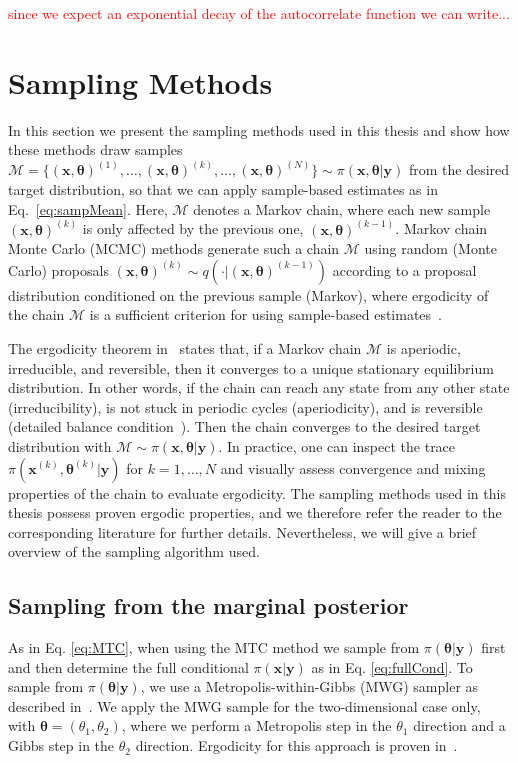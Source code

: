 \textcolor{red}{since we expect an exponential decay of the autocorrelate function we can write...}

\section{Sampling Methods}
\label{sec:sampling}
In this section we present the sampling methods used in this thesis and show how these methods draw samples $ \mathcal{M} = \{ (\bm{x}, \bm{\theta} )^{(1)}, \dots, (\bm{x}, \bm{\theta} )^{(k)}, \dots, (\bm{x}, \bm{\theta})^{(N)} \} \sim \pi(\bm{x}, \bm{\theta} |  \bm{y})$ from the desired target distribution, so that we can apply sample-based estimates as in Eq.~\ref{eq:sampMean}.
Here, $\mathcal{M}$ denotes a Markov chain, where each new sample $(\bm{x}, \bm{\theta})^{(k)}$ is only affected by the previous one, $(\bm{x}, \bm{\theta})^{(k-1)}$.
Markov chain Monte Carlo (MCMC) methods generate such a chain $\mathcal{M}$ using random (Monte Carlo) proposals $(\bm{x}, \bm{\theta})^{(k)} \sim q( \cdot |  (\bm{x}, \bm{\theta})^{(k-1)})$ according to a proposal distribution conditioned on the previous sample (Markov), where ergodicity of the chain $\mathcal{M}$ is a sufficient criterion for using sample-based estimates~\cite{tan2016LecNot, roberts2004general}.

The ergodicity theorem in~\cite{tan2016LecNot} states that, if a Markov chain $\mathcal{M}$ is aperiodic, irreducible, and reversible, then it converges to a unique stationary equilibrium distribution.
In other words, if the chain can reach any state from any other state (irreducibility), is not stuck in periodic cycles (aperiodicity), and is reversible (detailed balance condition~\cite{tan2016LecNot}).
Then the chain converges to the desired target distribution  with $ \mathcal{M} \sim \pi(\bm{x}, \bm{\theta} |  \bm{y})$.
In practice, one can inspect the trace $\pi(\bm{x}^{(k)}, \bm{\theta}^{(k)} |  \bm{y})$ for $k = 1, \dots, N$ and visually assess convergence and mixing properties of the chain to evaluate ergodicity.
The sampling methods used in this thesis possess proven ergodic properties, and we therefore refer the reader to the corresponding literature for further details.
Nevertheless, we will give a brief overview of the sampling algorithm used.

\subsection{Sampling from the marginal posterior}
As in Eq. \ref{eq:MTC}, when using the MTC method we sample from $\pi(\bm{\theta} |  \bm{y})$ first and then determine the full conditional $\pi(\bm{x} |  \bm{y})$ as in Eq. \ref{eq:fullCond}. To sample from $\pi(\bm{\theta} |  \bm{y})$, we use a Metropolis-within-Gibbs (MWG) sampler as described in~\cite{fox2016fast}.
We apply the MWG sample for the two-dimensional case only, with $\bm{\theta} = (\theta_1, \theta_2)$, where we perform a Metropolis step in the $\theta_1$ direction and a Gibbs step in the $\theta_2$ direction.
Ergodicity for this approach is proven in~\cite{roberts2006harris}.


